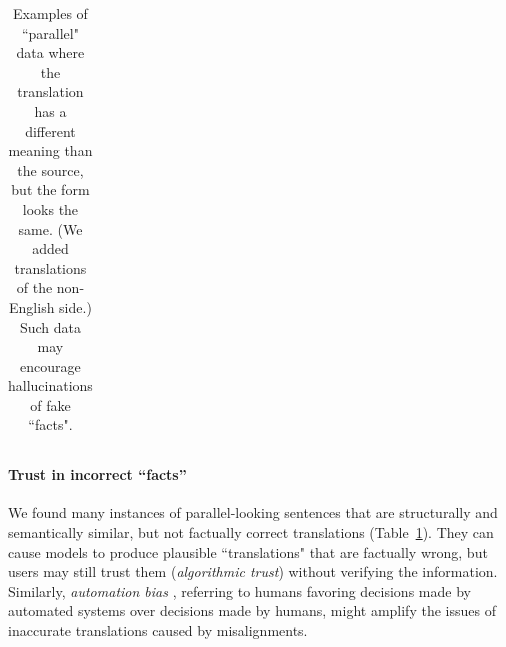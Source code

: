 \begin{table}[t!]
\begin{tabular}{ll}
            \bottomrule
        \end{tabular}%
    \caption{Examples of ``parallel" data where the translation has a different meaning than the source, but the form looks the same. (We added translations of the non-English side.) Such data may encourage hallucinations of fake ``facts".}
    \label{tab:not_actually_parallel}
\end{table}

\paragraph{Trust in incorrect ``facts''} %
We found many instances of parallel-looking sentences that are structurally and semantically similar, but not factually correct translations (Table~\ref{tab:not_actually_parallel}). They can cause models to produce plausible ``translations" that are factually wrong, but users may still trust them (\textit{algorithmic trust}) without verifying the information. %
Similarly, \textit{automation bias} \citep{skitka-etal-1999-does},
referring to humans favoring decisions made by automated systems over decisions made by humans, might amplify the issues of inaccurate translations caused by misalignments.

